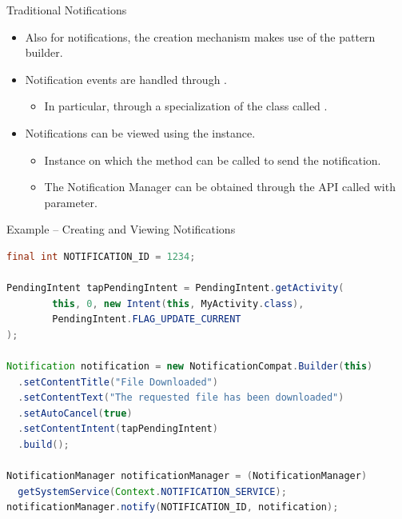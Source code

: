 \documentclass{beamer}
\begin{document}
  \begin{frame}{Traditional Notifications}
    \begin{itemize}\itemsep10pt
      \item Also for notifications, the creation mechanism makes use of the
      pattern builder.
      \item Notification events are handled through .
      \begin{itemize}
        \item In particular, through a specialization of the  class
        called .
      \end{itemize}
        \item Notifications can be viewed using the 
        instance.
      \begin{itemize}
        \item Instance on which the  method
        can be called to send the notification.
        \item The Notification Manager can be obtained through the
         API called with
         parameter.
      \end{itemize}
    \end{itemize}
    \begin{exampleblock}{Example -- Creating and Viewing Notifications}
      \begin{lstlisting}[language=Java]
final int NOTIFICATION_ID = 1234;
        
PendingIntent tapPendingIntent = PendingIntent.getActivity(
        this, 0, new Intent(this, MyActivity.class),
        PendingIntent.FLAG_UPDATE_CURRENT
);
        
Notification notification = new NotificationCompat.Builder(this)
  .setContentTitle("File Downloaded")
  .setContentText("The requested file has been downloaded")
  .setAutoCancel(true)
  .setContentIntent(tapPendingIntent)
  .build();
        
NotificationManager notificationManager = (NotificationManager)
  getSystemService(Context.NOTIFICATION_SERVICE);
notificationManager.notify(NOTIFICATION_ID, notification);
      \end{lstlisting}
    \end{exampleblock}
  \end{frame}
\end{document}
